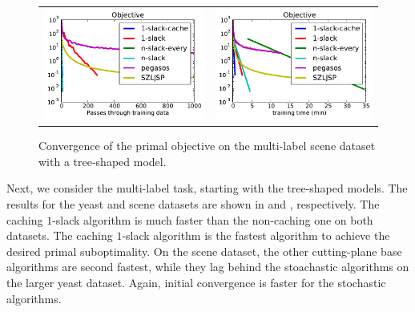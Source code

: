 \begin{figure}
    \begin{tabu} to 
    \includegraphics[width=\linewidth]{evaluation/images/scene_tree}&%
    \includegraphics[width=\linewidth]{evaluation/images/scene_tree_time}
    \end{tabu}
\caption{%
   Convergence of the primal objective on the multi-label scene dataset with a tree-shaped model.
   }
\end{figure}

Next, we consider the multi-label task, starting with the tree-shaped models.
The results for the yeast and scene datasets are shown in  and ,
respectively. The caching $1$-slack algorithm is much faster than the non-caching one on both datasets.
The caching $1$-slack algorithm is the fastest algorithm to achieve the desired primal suboptimality.
On the scene dataset, the other cutting-plane base algorithms are second fastest, while they
lag behind the stoachastic algorithms on the larger yeast dataset. Again, initial convergence is
faster for the stochastic algorithms.

